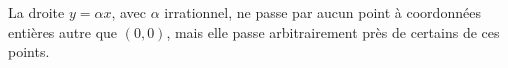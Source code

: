La droite $y = \alpha x$, avec $\alpha$ irrationnel, ne passe par aucun point à coordonnées entières autre que $(0, 0)$, mais elle passe arbitrairement près de certains de ces points.
